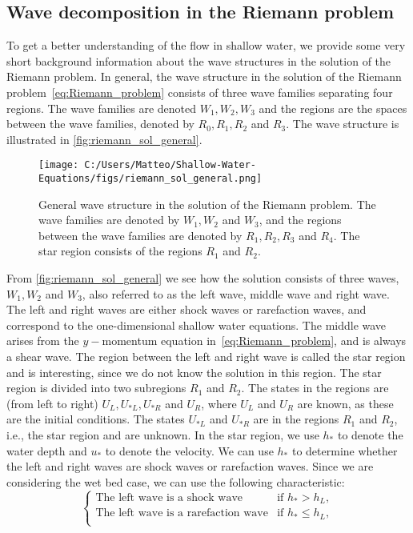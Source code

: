 \subsection{Wave decomposition in the Riemann problem}
To get a better understanding of the flow in shallow water, we provide some very short background information about the wave structures in the solution of the Riemann problem.
In general, the wave structure in the solution of the Riemann problem~\eqref{eq:Riemann_problem} consists of three wave families separating four regions.
The wave families are denoted $W_1, W_2, W_3$ and the regions are the spaces between the wave families, denoted by $R_0, R_1, R_2$ and $R_3$.
The wave structure is illustrated in \autoref{fig:riemann_sol_general}.
\begin{figure}[H]
    \centering
    \texttt{[image: C:/Users/Matteo/Shallow-Water-Equations/figs/riemann\_sol\_general.png]}
    \caption{General wave structure in the solution of the Riemann problem.
            The wave families are denoted by $W_1, W_2$ and $W_3$, and the regions between the wave families are denoted by $R_1, R_2, R_3$ and $R_4$. 
            The star region consists of the regions $R_1$ and $R_2$.}\label{fig:riemann_sol_general}
\end{figure}
From \autoref{fig:riemann_sol_general} we see how the solution consists of three waves, $W_1, W_2$ and $W_3$, also referred to as the left wave, middle wave and right wave.
The left and right waves are either shock waves or rarefaction waves, and correspond to the one-dimensional shallow water equations.
The middle wave arises from the $y-$momentum equation in~\eqref{eq:Riemann_problem}, and is always a shear wave.
The region between the left and right wave is called the star region and is interesting, since we do not know the solution in this region.
The star region is divided into two subregions $R_1$ and $R_2$.
The states in the regions are (from left to right) $U_L, U_{*L}, U_{*R}$ and $U_R$, where $U_L$ and $U_R$ are known, as these are the initial conditions.
The states $U_{*L}$ and $U_{*R}$ are in the regions $R_1$ and $R_2$, i.e., the star region and are unknown.
In the star region, we use $h_*$ to denote the water depth and $u_*$ to denote the velocity.
We can use $h_*$ to determine whether the left and right waves are shock waves or rarefaction waves.
Since we are considering the wet bed case, we can use the following characteristic:
\begin{equation}\label{eq:def_left_wave}
    \begin{cases}
        \text{The left wave is a shock wave} & \text{if } h_* > h_L, \\
        \text{The left wave is a rarefaction wave} & \text{if } h_* \leq h_L, \\        
    \end{cases} 
\end{equation}
